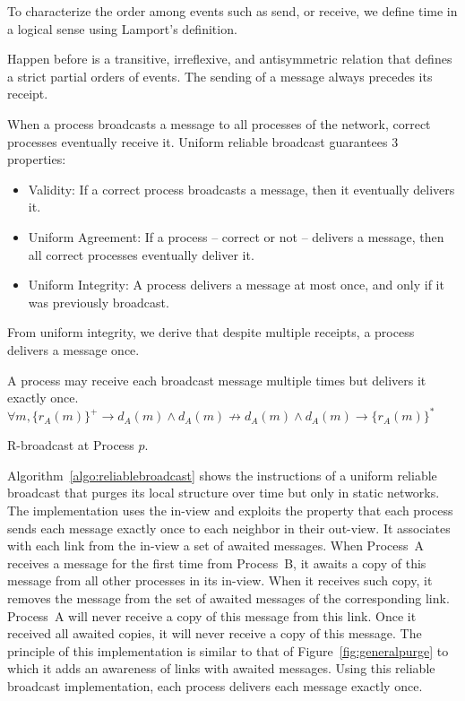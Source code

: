 To characterize the order among events such as send, or receive, we define time
in a logical sense using Lamport’s definition.

\begin{definition}
  Happen before is a transitive, irreflexive, and antisymmetric relation that
  defines a strict partial orders of events. The sending of a message always
  precedes its receipt. 
\end{definition}

\begin{definition} 
  When a process broadcasts a message to all processes of the network, correct
  processes eventually receive it. Uniform reliable broadcast guarantees 3
  properties:
  \begin{itemize}
  \item Validity: If a correct process broadcasts a message, then it
    eventually delivers it.
  \item Uniform Agreement: If a process -- correct or not -- delivers a message,
    then all correct processes eventually deliver it.
  \item Uniform Integrity: A process delivers a message at most once, and only if
    it was previously broadcast.
  \end{itemize}
\end{definition}

From uniform integrity, we derive that despite multiple receipts, a process
delivers a message once.

\begin{definition}
  A process may receive each broadcast message multiple times but delivers it
  exactly once.
  $\forall m, \{r_A(m)\}^+ \rightarrow d_A(m) \wedge d_A(m) \not\rightarrow d_A(m) \wedge d_A(m) \rightarrow \{r_A(m)\}^*$
\end{definition}

\begin{algorithm}[h]
  
  \caption{\label{algo:reliablebroadcast}R-broadcast at Process $p$.}
\end{algorithm}

Algorithm~\ref{algo:reliablebroadcast} shows the instructions of a uniform
reliable broadcast that purges its local structure over time but only in static
networks. The implementation uses the in-view and exploits the property that
each process sends each message exactly once to each neighbor in their
out-view. It associates with each link from the in-view a set of awaited
messages. When Process~A receives a message for the first time from Process~B,
it awaits a copy of this message from all other processes in its in-view. When
it receives such copy, it removes the message from the set of awaited messages
of the corresponding link. Process~A will never receive a copy of this message
from this link. Once it received all awaited copies, it will never receive a
copy of this message. The principle of this implementation is similar to that of
Figure~\ref{fig:generalpurge} to which it adds an awareness of links with
awaited messages. Using this reliable broadcast implementation, each process
delivers each message exactly once.

